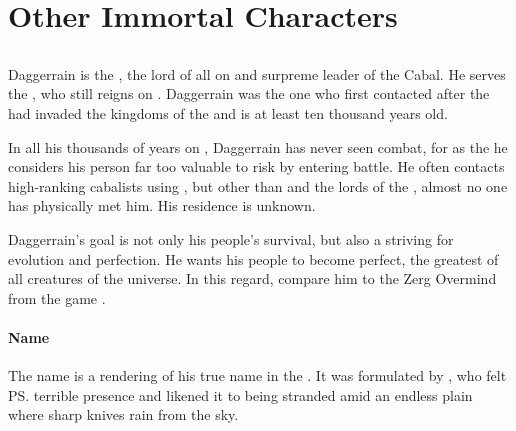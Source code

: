 
\part{Other Immortal Characters}























\chapter{\Banes}
\section{\Daggerrain}
Daggerrain is the \baneoverlord, the lord of all \banes{} on \Miith{} and surpreme leader of the Cabal. He serves the \baneking{} \Voidbringer, who still reigns on \Erebos. Daggerrain was the one who first contacted \Semiza{} after the \dragons{} had invaded the kingdoms of the \nephilim{} and is at least ten thousand years old. 

In all his thousands of years on \Miith{}, Daggerrain has never seen combat, for as the \baneoverlord{} he considers his person far too valuable to risk by entering battle. He often contacts high-ranking cabalists using , but other than \banelords{} and the lords of the \resphain, almost no one has physically met him. His residence is unknown.

Daggerrain's goal is not only his people's survival, but also a striving for evolution and perfection. He wants his people to become perfect, the greatest of all creatures of the universe. In this regard, compare him to the Zerg Overmind from the game \cite{VideoGame:Starcraft}.









\subsection{Name}
The name \Daggerrain{} is a rendering of his true name in the . 
It was formulated by \Semiza, who felt \ps{\Daggerrain}{} terrible presence and likened it to being stranded amid an endless plain where sharp knives rain from the sky.  









